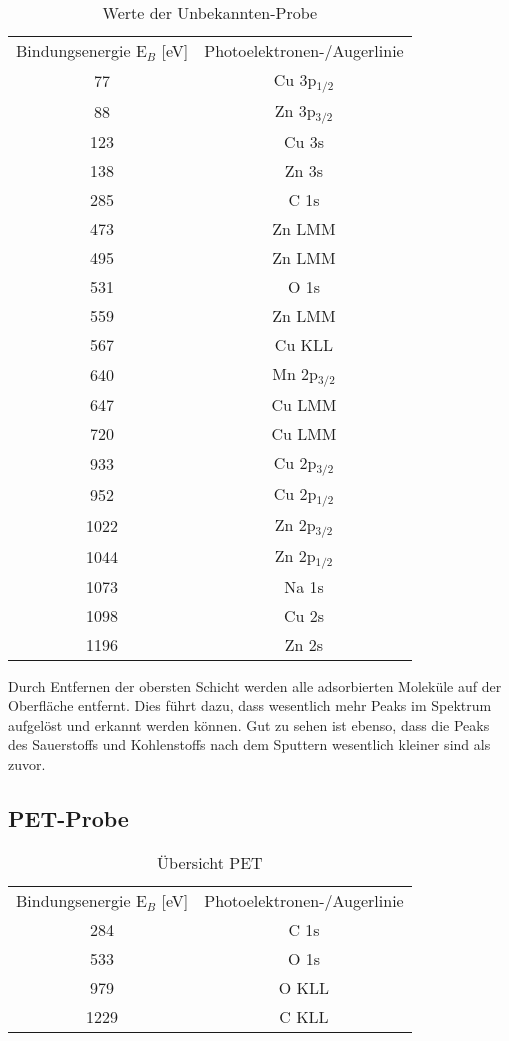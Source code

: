 \documentclass{article}
\begin{document}
\begin{table}[htpb]
  \centering
  \caption{Werte der Unbekannten-Probe}
  \label{tab:chsac}
  \begin{tabular}{cc}
   Bindungsenergie E$_B$ [eV] & Photoelektronen-/Augerlinie\\
  77 & Cu 3p$_{1/2}$ \\
 88 & Zn 3p$_{3/2}$ \\
 123 & Cu 3s \\
 138 & Zn 3s \\
 285 & C 1s \\
 473 & Zn LMM \\
 495 & Zn LMM \\
 531 & O 1s \\
 559 & Zn LMM \\
 567 & Cu KLL \\
 640 & Mn 2p$_{3/2}$ \\
 647 & Cu LMM \\
 720 & Cu LMM \\
 933 & Cu 2p$_{3/2}$ \\
 952 & Cu 2p$_{1/2}$ \\
 1022 & Zn 2p$_{3/2}$\\
 1044 & Zn 2p$_{1/2}$ \\
 1073 & Na 1s \\
 1098 & Cu 2s \\
 1196 & Zn 2s \\

  \end{tabular}

\end{table}
 
Durch Entfernen der obersten Schicht werden alle adsorbierten Moleküle auf der Oberfläche entfernt. Dies führt dazu, dass wesentlich mehr Peaks im Spektrum aufgelöst und erkannt werden können. Gut zu sehen ist ebenso, dass die Peaks des Sauerstoffs und Kohlenstoffs nach dem Sputtern wesentlich kleiner sind als zuvor.

\subsection{PET-Probe}

\begin{table}[htpb]
  \centering
  \caption{Übersicht PET}
  \label{tab:pet}
  \begin{tabular}{cc}
   Bindungsenergie E$_B$ [eV] & Photoelektronen-/Augerlinie\\
 284  & C 1s \\
 533 & O 1s \\
 979 & O KLL \\
 1229 & C KLL \\
   \end{tabular}
\end{table}
  
\end{document}
